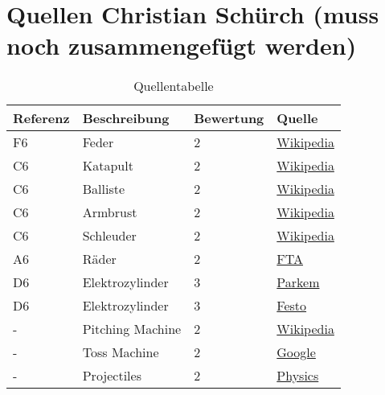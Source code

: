 \section{Quellen Christian Schürch (muss noch zusammengefügt werden)}

\begin{table}[h!]
	\centering
	\begin{tabular}{l l l l}
		Referenz & Beschreibung & Bewertung & Quelle \\
		\hline
        
        F6 & Feder & 2 & \href{http://de.wikipedia.org/wiki/Feder_(Technik)}{Wikipedia} \\
        
	    C6 & Katapult & 2 & \href{http://de.wikipedia.org/wiki/Katapult}{Wikipedia} \\
	    
	    C6 & Balliste & 2 & \href{http://de.wikipedia.org/wiki/Balliste}{Wikipedia} \\
	    
	    C6 & Armbrust & 2 & \href{http://de.wikipedia.org/wiki/Armbrust}{Wikipedia} \\
	    
	    C6 & Schleuder & 2 & \href{http://de.wikipedia.org/wiki/Zwille}{Wikipedia} \\
        
        A6 & Räder & 2 & \href{http://www.fta.ch/de/r/raeder-2000.html}{FTA} \\
        
        D6 & Elektrozylinder & 3 & \href{http://www.parkem.ch/medien/produkte/bewegungsmechanik/pdf/mechanik_et_tech_de_190-550011.pdf}{Parkem} \\
        
        D6 & Elektrozylinder & 3 & \href{http://www.festo.com/net/de_de/SupportPortal/Details/219992/PressArticle.aspx}{Festo} \\
        
        - & Pitching Machine & 2 & \href{http://en.wikipedia.org/wiki/Pitching_machine}{Wikipedia} \\
        
        - & Toss Machine & 2 & \href{https://www.google.ch/search?q=toss+machine&ie=utf-8&oe=utf-8&aq=t&rls=org.mozilla:de:official&client=firefox-a&channel=sb&gfe_rd=cr&ei=zk4uVPT4Mseh7AbexYGAAg}{Google} \\
        
        - & Projectiles & 2 & \href{http://physics.info/projectiles/}{Physics} \\
        
	\end{tabular}
	\caption{Quellentabelle}
	\label{tab:quelle}
\end{table}
